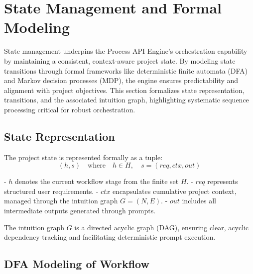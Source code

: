 \documentclass[11pt,a4paper]{article}
\begin{document}
\section{State Management and Formal Modeling}
\label{sec:state_management}

State management underpins the Process API Engine’s orchestration capability by maintaining a consistent, context-aware project state. By modeling state transitions through formal frameworks like deterministic finite automata (DFA) and Markov decision processes (MDP), the engine ensures predictability and alignment with project objectives. This section formalizes state representation, transitions, and the associated intuition graph, highlighting systematic sequence processing critical for robust orchestration.

\subsection{State Representation}
\label{subsec:state_representation}

The project state is represented formally as a tuple:
\[
(h, s) \quad\text{where}\quad h \in H,\quad s = (req, ctx, out)
\]

- \( h \) denotes the current workflow stage from the finite set \( H \).
- \( req \) represents structured user requirements.
- \( ctx \) encapsulates cumulative project context, managed through the intuition graph \( G = (N, E) \).
- \( out \) includes all intermediate outputs generated through prompts.

The intuition graph \( G \) is a directed acyclic graph (DAG), ensuring clear, acyclic dependency tracking and facilitating deterministic prompt execution.

\subsection{DFA Modeling of Workflow}
\label{subsec:dfa_modeling}
\end{document}
